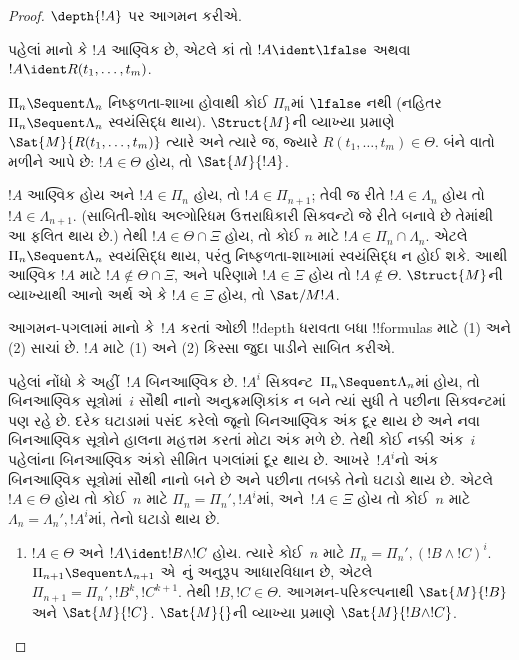 \documentclass[../../../include/open-logic-section]{subfiles}
\begin{document}
\begin{proof}
  $\depth{!A}$
  પર આગમન
  કરીએ.

પહેલાં માનો કે
$!A$ આણ્વિક છે,
એટલે કાં તો
$!A \ident \lfalse$
અથવા
$!A
\ident R(t_1, \dots, t_m)$.

$\Pi_n \Sequent \Lambda_n$
નિષ્ફળતા-શાખા
હોવાથી કોઈ
$\Pi_n$માં
$\lfalse$ નથી
(નહિતર
$\Pi_n \Sequent \Lambda_n$
સ્વયંસિદ્ધ
થાય).
$\Struct{M}$ની
વ્યાખ્યા પ્રમાણે
$\Sat{M}{R(t_1, \dots, t_m)}$
ત્યારે અને
ત્યારે જ,
જ્યારે
$R(t_1, \dots, t_m) \in
\Theta$.
બંને વાતો
મળીને આપે છે:
$!A \in
\Theta$ હોય,
તો
$\Sat{M}{!A}$.

$!A$ આણ્વિક
હોય અને
$!A \in \Pi_n$
હોય, તો
$!A \in \Pi_{n+1}$;
તેવી જ રીતે
$!A \in \Lambda_n$
હોય તો
$!A \in \Lambda_{n+1}$.
(સાબિતી-શોધ
અલ્ગોરિધમ
ઉત્તરાધિકારી
સિક્વન્ટો જે
રીતે બનાવે
છે તેમાંથી
આ ફલિત થાય
છે.) તેથી
$!A \in \Theta \cap \Xi$
હોય, તો કોઈ
$n$ માટે
$!A \in \Pi_n \cap
\Lambda_n$.
એટલે
$\Pi_n \Sequent \Lambda_n$
સ્વયંસિદ્ધ
થાય, પરંતુ
નિષ્ફળતા-શાખામાં
સ્વયંસિદ્ધ ન
હોઈ શકે.
આથી આણ્વિક
$!A$ માટે
$!A \notin \Theta
\cap \Xi$,
અને પરિણામે
$!A \in \Xi$
હોય તો
$!A \notin \Theta$.
$\Struct{M}$ની
વ્યાખ્યાથી
આનો અર્થ
એ કે
$!A \in \Xi$
હોય, તો
$\Sat/{M}{!A}$.

આગમન-પગલામાં
માનો કે~$!A$
કરતાં ઓછી
!!{depth} ધરાવતા
બધા !!{formula}s
માટે (1)
અને (2)
સાચાં છે.
$!A$ માટે
(1) અને
(2) કિસ્સા
જુદા પાડીને
સાબિત કરીએ.

પહેલાં નોંધો કે અહીં~$!A$ બિનઆણ્વિક છે.
$!A^i$ સિક્વન્ટ~$\Pi_n\Sequent\Lambda_n$માં
હોય, તો બિનઆણ્વિક સૂત્રોમાં~$i$ સૌથી નાનો
અનુક્રમણિકાંક ન બને ત્યાં સુધી તે પછીના સિક્વન્ટમાં
પણ રહે છે. દરેક ઘટાડામાં પસંદ કરેલો જૂનો
બિનઆણ્વિક અંક દૂર થાય છે અને નવા બિનઆણ્વિક
સૂત્રોને હાલના મહત્તમ કરતાં મોટા અંક મળે છે.
તેથી કોઈ નક્કી અંક~$i$ પહેલાંના બિનઆણ્વિક અંકો
સીમિત પગલાંમાં દૂર થાય છે. આખરે~$!A^i$નો અંક
બિનઆણ્વિક સૂત્રોમાં સૌથી નાનો બને છે અને પછીના
તબક્કે તેનો ઘટાડો થાય છે. એટલે~$!A\in\Theta$
હોય તો કોઈ~$n$ માટે $\Pi_n=\Pi_n',!A^i$માં,
અને~$!A\in\Xi$ હોય તો કોઈ~$n$ માટે
$\Lambda_n=\Lambda_n',!A^i$માં, તેનો ઘટાડો થાય છે.

\begin{enumerate}
  \item $!A \in \Theta$
  અને
  $!A \ident !B \land !C$
  હોય. ત્યારે
  કોઈ~$n$ માટે
  $\Pi_n = \Pi_n', (!B \land !C)^i$.
  $\Pi_{n+1} \Sequent
  \Lambda_{n+1}$
  એ~\LeftR{\land}નું
  અનુરૂપ
  આધારવિધાન
  છે, એટલે
  $\Pi_{n+1} = \Pi_n', !B^k, !C^{k+1}$.
  તેથી
  $!B, !C \in
  \Theta$.
  આગમન-પરિકલ્પનાથી
  $\Sat{M}{!B}$
  અને
  $\Sat{M}{!C}$.
  $\Sat{M}{}$ની
  વ્યાખ્યા પ્રમાણે
  $\Sat{M}{!B \land !C}$.


\end{enumerate}
\end{proof}
\end{document}
